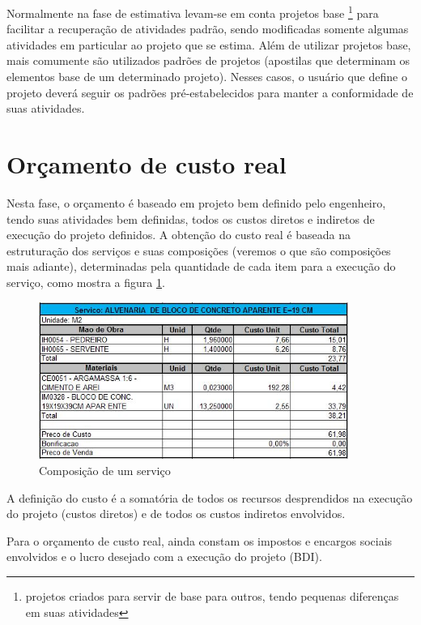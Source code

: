 Normalmente na fase de estimativa levam-se em conta projetos base \footnote{projetos criados para servir de base para outros, tendo pequenas diferenças em suas atividades} para facilitar a recuperação de atividades padrão, sendo modificadas somente algumas atividades em particular ao projeto que se estima. Além de utilizar projetos base, mais comumente são utilizados padrões de projetos (apostilas que determinam os elementos base de um determinado projeto). Nesses casos, o usuário que define o projeto deverá seguir os padrões pré-estabelecidos para manter a conformidade de suas atividades.

\section{Orçamento de custo real}
Nesta fase, o orçamento é baseado em projeto bem definido pelo engenheiro, tendo suas atividades bem definidas, todos os custos diretos e indiretos de execução do projeto definidos.
A obtenção do custo real é baseada na estruturação dos serviços e suas composições (veremos o que são composições mais adiante), determinadas pela quantidade de cada item para a execução do serviço, como mostra a figura \ref{img:composicao}.

\begin{figure}[htb]
\centering
\includegraphics[width=0.9\textwidth]{figuras/composicao.jpg}
\caption{Composição de um serviço}
\label{img:composicao}
\end{figure}

A definição do custo é a somatória de todos os recursos desprendidos na execução do projeto (custos diretos) e de todos os custos indiretos envolvidos.

Para o orçamento de custo real, ainda constam os impostos e encargos sociais envolvidos e o lucro desejado com a execução do projeto (BDI).